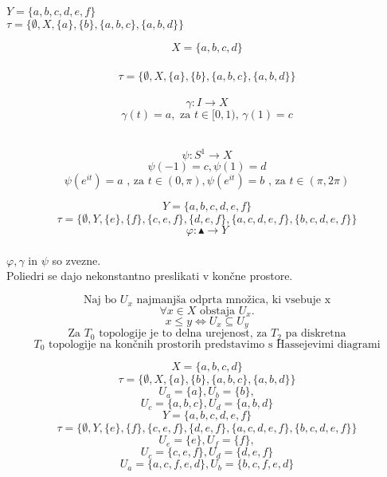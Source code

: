 \documentclass[a4paper,12pt]{article}
\begin{document}
$Y = \{a,b,c,d, e, f\}$\\
$\tau = \{\emptyset, X, \{a\}, \{b\}, \{a,b,c\}, \{a,b,d\}\}$


\begin{frame}
    $$X = \{a,b,c,d\}$$\\
    $$\tau = \{\emptyset, X, \{a\}, \{b\}, \{a,b,c\}, \{a,b,d\}\}$$ \\
    $$\gamma : I \rightarrow X$$
    $$  \gamma  (t)  = a, \text{ za }t \in [0,1)\text{, }  \gamma  (1) = c$$\\
    \pause

    $$\psi: S^1 \rightarrow X$$
    $$\psi(-1) = c, \psi(1) = d$$
    $$ \psi(e^{it}) = a\text{ , za } t\in (0,\pi), \psi(e^{it}) = b\text{ , za } t\in (\pi,2\pi)$$


\end{frame}
\begin{frame}
    $$Y = \{a,b,c,d, e, f\}$$
    $$ \tau = \{ \emptyset, Y , \{e\}, \{f\} , \{c,e,f\},\{d,e,f\} ,\{a, c, d, e, f \}, \{b, c, d, e, f\}\}$$
    $$\varphi: \blacktriangle \rightarrow Y$$\\
    $\varphi ,\gamma$ in $ \psi$ so zvezne. \\Poliedri se dajo nekonstantno preslikati v končne prostore.
\end{frame}

\begin{frame}
    $$\text{Naj bo } U_x \text{ najmanjša odprta množica, ki vsebuje x}$$
    $$ \forall x \in X \text{ obstaja } U_x. $$
    $$x \le y \Leftrightarrow U_x \subseteq U_y $$
    $$\text{Za } T_0 \text{ topologije je to delna urejenost, za $T_2$ pa diskretna}$$
    $$ T_0 \text{ topologije na končnih prostorih predstavimo s Hassejevimi diagrami}$$
\end{frame}

\begin{frame}
    $$X = \{a,b,c,d\}$$
    $$\tau = \{\emptyset, X, \{a\}, \{b\}, \{a,b,c\}, \{a,b,d\}\}$$
    $$U_a = \{a\}, U_b=\{b\},$$
    $$ U_c = \{a, b, c\}, U_d = \{a, b, d\}$$
    \pause
    $$Y = \{a,b,c,d, e, f\}$$
    $$ \tau = \{ \emptyset, Y , \{e\}, \{f\} , \{c,e,f\},\{d,e,f\} ,\{a, c, d, e, f \}, \{b, c, d, e, f\}\}$$
    $$U_e = \{e\}, U_f=\{f\},$$
    $$U_c = \{c, e, f\}, U_d = \{d, e, f\}$$
    $$U_a = \{a,c,f,e,d\}, U_b=\{b,c,f,e,d\}$$
\end{frame}
\end{document}

